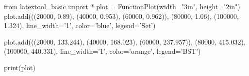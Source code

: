 
\begin{python}
from latextool_basic import *
plot = FunctionPlot(width="3in", height="2in")
plot.add(((20000, 0.89),
          (40000, 0.953),
          (60000, 0.962)),
          (80000, 1.06),
          (100000, 1.324),
          line_width='1', color='blue', legend='Set')

plot.add(((20000, 133.244),
          (40000, 168.023),
          (60000, 237.957)),
          (80000, 415.032),
          (100000, 440.331),
          line_width='1', color='orange', legend='BST')

          
print(plot)
\end{python}


